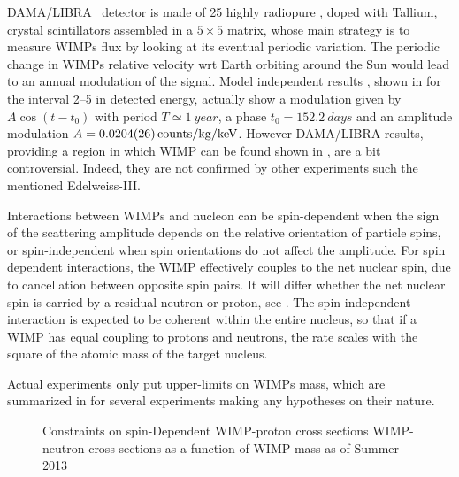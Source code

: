 DAMA/LIBRA~\cite{damalibra} detector is made of 25 highly radiopure , doped with Tallium, crystal scintillators assembled in a $5\times5$ matrix, whose main strategy is to measure WIMPs flux by looking at its eventual periodic variation. The periodic change in WIMPs relative velocity wrt Earth orbiting around the Sun would lead to an annual modulation of the signal. Model independent results
, shown in \Fig{\ref{fig:damalibra}} for the interval \SIrange{2}{5}{\kev} in detected energy, actually show a modulation given by $A\cos{(t-t_0)}$ with period $T\simeq \SI{1}{year}$, a phase $t_0=\SI{152.2}{days}$ and an amplitude modulation $A =\SI{0.0204\pm0.0026}{counts/\kg/\keV}$. However DAMA/LIBRA results, providing a region in which WIMP can be found shown in \Fig{\ref{fig:WIMPcs}}, are a bit controversial. Indeed, they are not confirmed by other experiments such the mentioned Edelweiss-III.

Interactions between WIMPs and nucleon can be spin-dependent when the sign of the scattering amplitude depends on the relative orientation of particle spins, or spin-independent when spin orientations do not affect the amplitude. For spin dependent interactions, the WIMP effectively couples to the net nuclear spin, due to cancellation between opposite spin pairs. It will differ whether the net nuclear spin is carried by a residual neutron or proton, see \Fig{\ref{fig:WIMPcsSD}}. The spin-independent interaction is expected to be coherent within the entire nucleus, so that if a WIMP has equal coupling to protons and neutrons, the rate scales with the square of the atomic mass of the target nucleus. 

Actual experiments only put upper-limits on WIMPs mass, which are summarized in \Fig{\ref{fig:WIMPcs}} for several experiments making any hypotheses on their nature.

\begin{figure}[p]
\centering
{}\quad
{}

\caption{Constraints on spin-Dependent WIMP-proton cross sections WIMP-neutron cross sections  as a function of WIMP
mass as of Summer 2013}
\label{fig:WIMPcsSD}
\end{figure}

